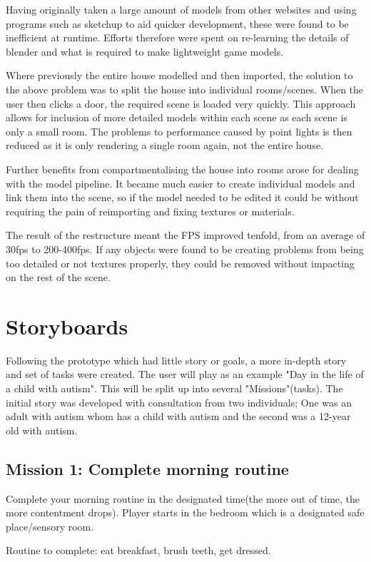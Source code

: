 \documentclass[11pt]{report}
\begin{document}
Having originally taken a large amount of models from other websites and using programs such as sketchup to aid quicker development, these were found to be inefficient at runtime. Efforts therefore were spent on re-learning the details of blender and what is required to make lightweight game models. 

Where previously the entire house modelled and then imported, the solution to the above problem was to split the house into individual rooms/scenes. When the user then clicks a door, the required scene is loaded very quickly. This approach allows for inclusion of more detailed models within each scene as each scene is only a small room. The problems to performance caused by point lights is then reduced as it is only rendering a single room again, not the entire house. 

Further benefits from compartmentalising the house into rooms arose for dealing with the model pipeline. It became much easier to create individual models and link them into the scene, so if the model needed to be edited it could be without requiring the pain of reimporting and fixing textures or materials. 

The result of the restructure meant the FPS improved tenfold, from an average of 30fps to 200-400fps. If any objects were found to be creating problems from being too detailed or not textures properly, they could be removed without impacting on the rest of the scene.

\section{Storyboards}
Following the prototype which had little story or goals, a more in-depth story and set of tasks were created. The user will play as an example "Day in the life of a child with autism". This will be split up into several "Missions"(tasks). The initial story was developed with consultation from two individuals; One was an adult with autism whom has a child with autism and the second was a 12-year old with autism.

\subsection*{Mission 1: Complete morning routine}
Complete your morning routine in the designated time(the more out of time, the more contentment drops). Player starts in the bedroom which is a designated safe place/sensory room. 

Routine to complete: eat breakfast, brush teeth, get dressed.
\end{document}
